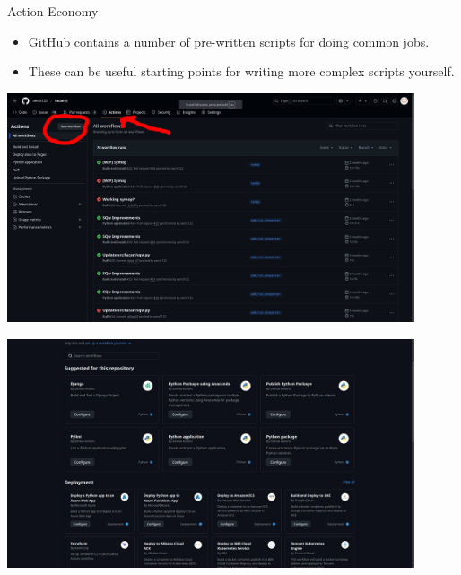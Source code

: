 \documentclass[usenames,dvipsnames]{beamer}
\begin{document}
\begin{frame}{Action Economy}
    \begin{itemize}[<+->]
        \item{}GitHub contains a number of pre-written scripts for doing common jobs.
        \item{}These can be useful starting points for writing more complex scripts yourself.
    \end{itemize}

     {
        \begin{center}
            \includegraphics[width=0.9\textwidth]{Images/findingmarket.jpg}
        \end{center}
    }
     {
        \begin{center}
            \includegraphics[width=0.9\textwidth]{Images/exampleactions.jpg}
        \end{center}
    }
\end{frame}
\end{document}
